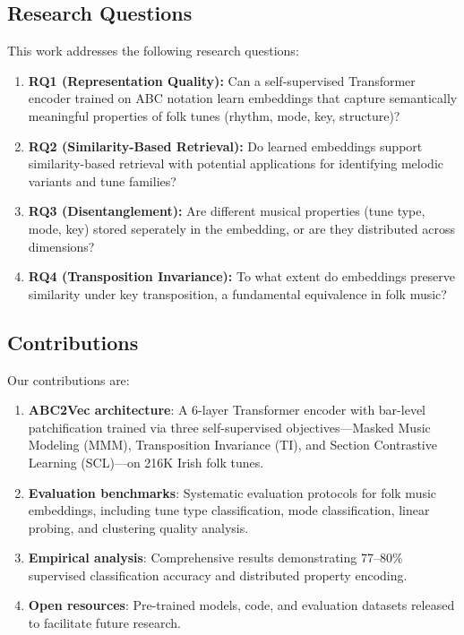 \documentclass[]{interact}
\theoremstyle{plain}
\theoremstyle{definition}
\theoremstyle{remark}
\begin{document}
\subsection{Research Questions}

This work addresses the following research questions:

\begin{enumerate}
\item \textbf{RQ1 (Representation Quality):} Can a self-supervised Transformer encoder trained on ABC notation learn embeddings that capture semantically meaningful properties of folk tunes (rhythm, mode, key, structure)?
\item \textbf{RQ2 (Similarity-Based Retrieval):} Do learned embeddings support similarity-based retrieval with potential applications for identifying melodic variants and tune families?
\item \textbf{RQ3 (Disentanglement):} Are different musical properties (tune type, mode, key) stored seperately in the embedding, or are they distributed across dimensions?
\item \textbf{RQ4 (Transposition Invariance):} To what extent do embeddings preserve similarity under key transposition, a fundamental equivalence in folk music?
\end{enumerate}
    
\subsection{Contributions}

Our contributions are:

\begin{enumerate}
\item \textbf{ABC2Vec architecture}: A 6-layer Transformer encoder with bar-level patchification trained via three self-supervised objectives—Masked Music Modeling (MMM), Transposition Invariance (TI), and Section Contrastive Learning (SCL)—on 216K Irish folk tunes.
\item \textbf{Evaluation benchmarks}: Systematic evaluation protocols for folk music embeddings, including tune type classification, mode classification, linear probing, and clustering quality analysis.
\item \textbf{Empirical analysis}: Comprehensive results demonstrating 77--80\% supervised classification accuracy and distributed property encoding.
\item \textbf{Open resources}: Pre-trained models, code, and evaluation datasets released to facilitate future research.
\end{enumerate}
\end{document}
